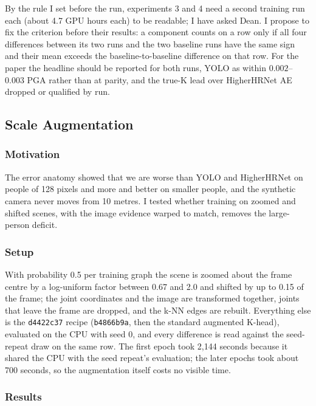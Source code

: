 By the rule I set before the run, experiments 3 and 4 need a second training run each (about 4.7 GPU hours each) to be readable; I have asked Dean.
I propose to fix the criterion before their results: a component counts on a row only if all four differences between its two runs and the two baseline runs have the same sign and their mean exceeds the baseline-to-baseline difference on that row.
For the paper the headline should be reported for both runs, YOLO as within $0.002$--$0.003$ PGA rather than at parity, and the true-K lead over HigherHRNet AE dropped or qualified by run.

\subsection{Scale Augmentation}

\subsubsection{Motivation}

The error anatomy showed that we are worse than YOLO and HigherHRNet on people of 128 pixels and more and better on smaller people, and the synthetic camera never moves from 10 metres.
I tested whether training on zoomed and shifted scenes, with the image evidence warped to match, removes the large-person deficit.

\subsubsection{Setup}

With probability 0.5 per training graph the scene is zoomed about the frame centre by a log-uniform factor between 0.67 and 2.0 and shifted by up to 0.15 of the frame; the joint coordinates and the image are transformed together, joints that leave the frame are dropped, and the k-NN edges are rebuilt.
Everything else is the \texttt{d4422c37} recipe (\texttt{b4866b9a}, then the standard augmented K-head), evaluated on the CPU with seed 0, and every difference is read against the seed-repeat draw on the same row.
The first epoch took 2,144 seconds because it shared the CPU with the seed repeat's evaluation; the later epochs took about 700 seconds, so the augmentation itself costs no visible time.

\subsubsection{Results}

